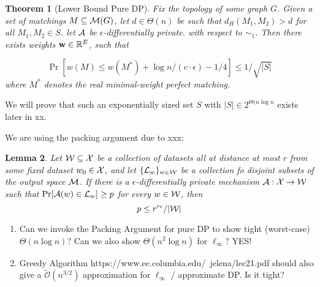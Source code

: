 \documentclass{article}
\newtheorem{theorem}{Theorem}[section]
\newtheorem{lemma}[theorem]{Lemma}
\begin{document}

\begin{theorem}[Lower Bound Pure DP]
Fix the topology of some graph $G$.
Given a set of matchings $M \subseteq \mathcal{M}(G)$, let $d \in \Theta(n)$ be such that $d_H(M_1, M_2) > d$ for all $M_1, M_2 \in S$.
let $\mathcal{A}$ be $\epsilon$-differentially private. with respect to $\sim_1$. 
Then there exists weights $\mathbf{w}\in \mathbb{R}^E$, such that 

\[
\Pr\left[w(M) \leq w(M^*) + \log n / (c \cdot \epsilon)-1/4\right] \leq 1/\sqrt{|S|}
\]
where $M^*$ denotes the real minimal-weight perfect matching.
\end{theorem}

We will prove that such an exponentially sized set $S$ with $|S| \in 2^{\Theta(n \log n}$ exists later in xx.

We are using the packing argument due to xxx:
\begin{lemma}
    Let $\mathcal{W} \subseteq \mathcal{X}$ be a collection of datasets all at distance at most $r$ from some fixed dataset $w_0 \in \mathcal{X}$, and let $\{\mathcal{L}_w\}_{w \in \mathcal{W}}$ be a collection fo disjoint subsets of the output space $\mathcal{M}$. 
    If there is a $\epsilon$-differentially private mechanism $\mathcal{A}: \mathcal{X} \rightarrow \mathcal{W}$ such that $\Pr[\mathcal{A}(w) \in \mathcal{L}_w] \geq p$ for every $w \in \mathcal{W}$, then
    \[
    p \leq r^{r \epsilon} / {|\mathcal{W}|}
    \]
\end{lemma}


\begin{enumerate}
    \item Can we invoke the Packing Argument for pure DP to show tight (worst-case) $\Theta(n \log n)$? Can we also show $\Theta(n^2 \log n)$ for $\ell_\infty$? YES!
    \item Greedy Algorithm https://www.ee.columbia.edu/~jelena/lec21.pdf should also give a $\mathcal{\tilde{O}}(n^{3/2})$ approximation for $\ell_\infty$ / approximate DP. Is it tight?
\end{enumerate}


\newpage

\end{document}
